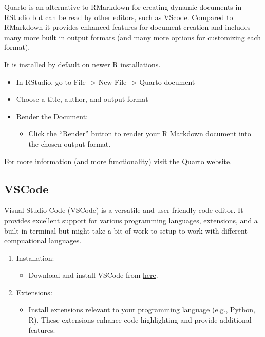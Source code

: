 \documentclass[
  letterpaper,
  DIV=11,
  numbers=noendperiod]{scrreprt}
\providecommand{\tightlist}{%
  \setlength{\itemsep}{0pt}\setlength{\parskip}{0pt}}\usepackage{longtable,booktabs,array}
\begin{document}
Quarto is an alternative to RMarkdown for creating dynamic documents in
RStudio but can be read by other editors, such as VScode. Compared to
RMarkdown it provides enhanced features for document creation and
includes many more built in output formats (and many more options for
customizing each format).

It is installed by default on newer R installations.

\begin{itemize}
\tightlist
\item
  In RStudio, go to File -\textgreater{} New File -\textgreater{} Quarto
  document
\item
  Choose a title, author, and output format
\item
  Render the Document:

  \begin{itemize}
  \tightlist
  \item
    Click the ``Render'' button to render your R Markdown document into
    the chosen output format.
  \end{itemize}
\end{itemize}

For more information (and more functionality) visit
\href{https://quarto.org/docs/get-started/hello/rstudio.html}{the Quarto
website}.

\subsection{VSCode}\label{vscode}

Visual Studio Code (VSCode) is a versatile and user-friendly code
editor. It provides excellent support for various programming languages,
extensions, and a built-in terminal but might take a bit of work to
setup to work with different compuational languages.

\begin{enumerate}
\def\labelenumi{\arabic{enumi}.}
\tightlist
\item
  Installation:

  \begin{itemize}
  \tightlist
  \item
    Download and install VSCode from
    \href{https://code.visualstudio.com/}{here}.
  \end{itemize}
\item
  Extensions:

  \begin{itemize}
  \tightlist
  \item
    Install extensions relevant to your programming language (e.g.,
    Python, R). These extensions enhance code highlighting and provide
    additional features.
  \end{itemize}
\end{enumerate}
\end{document}
